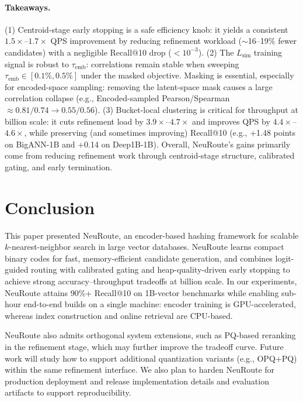 \documentclass[sigconf, nonacm]{acmart}
\begin{document}
\paragraph{Takeaways.}
(1) Centroid-stage early stopping is a safe efficiency knob: it yields a consistent $1.5\times$--$1.7\times$ QPS improvement by reducing refinement workload ($\sim$16--19\% fewer candidates) with a negligible Recall@10 drop ($<10^{-3}$).
(2) The $L_{\text{sim}}$ training signal is robust to $\tau_{\text{emb}}$: correlations remain stable when sweeping $\tau_{\text{emb}}\in[0.1\%,0.5\%]$ under the masked objective. Masking is essential, especially for encoded-space sampling: removing the latent-space mask causes a large correlation collapse (e.g., Encoded-sampled Pearson/Spearman $\approx 0.81/0.74 \rightarrow 0.55/0.56$).
(3) Bucket-local clustering is critical for throughput at billion scale: it cuts refinement load by $3.9\times$--$4.7\times$ and improves QPS by $4.4\times$--$4.6\times$, while preserving (and sometimes improving) Recall@10 (e.g., +1.48 points on BigANN-1B and +0.14 on Deep1B-1B). Overall, NeuRoute's gains primarily come from reducing refinement work through centroid-stage structure, calibrated gating, and early termination.




\section{Conclusion}
\label{sec:conclusion}

This paper presented NeuRoute, an encoder-based hashing framework for scalable $k$-nearest-neighbor search in large vector databases. NeuRoute learns compact binary codes for fast, memory-efficient candidate generation, and combines logit-guided routing with calibrated gating and heap-quality-driven early stopping to achieve strong accuracy--throughput tradeoffs at billion scale. In our experiments, NeuRoute attains 90\%+ Recall@10 on 1B-vector benchmarks while enabling sub-hour end-to-end builds on a single machine: encoder training is GPU-accelerated, whereas index construction and online retrieval are CPU-based.

NeuRoute also admits orthogonal system extensions, such as PQ-based reranking in the refinement stage, which may further improve the tradeoff curve.
Future work will study how to support additional quantization variants (e.g., OPQ+PQ) within the same refinement interface.
We also plan to harden NeuRoute for production deployment and release implementation details and evaluation artifacts to support reproducibility.
 




\end{document}
